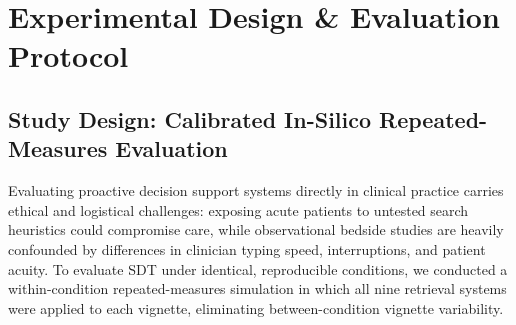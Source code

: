 \documentclass[10pt, onecolumn]{article}
\begin{document}
\section{Experimental Design \& Evaluation Protocol}
\label{sec:experiments}

\subsection{Study Design: Calibrated In-Silico Repeated-Measures Evaluation}

Evaluating proactive decision support systems directly in clinical practice carries ethical and logistical challenges: exposing acute patients to untested search heuristics could compromise care, while observational bedside studies are heavily confounded by differences in clinician typing speed, interruptions, and patient acuity. To evaluate SDT under identical, reproducible conditions, we conducted a within-condition repeated-measures simulation in which all nine retrieval systems were applied to each vignette, eliminating between-condition vignette variability.
\end{document}
